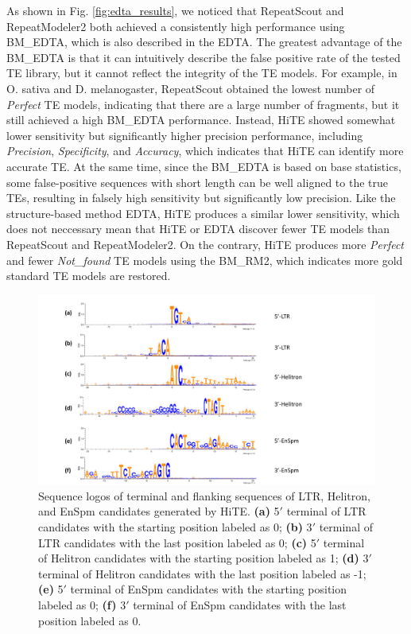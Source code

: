 \documentclass{bmcart}
\begin{document}
As shown in Fig. \ref{fig:edta_results}, we noticed that RepeatScout and RepeatModeler2 both achieved a consistently high performance using BM\_EDTA, which is also described in the EDTA\cite{ou2019benchmarking}. The greatest advantage of the BM\_EDTA is that it can intuitively describe the false positive rate of the tested TE library, but it cannot reflect the integrity of the TE models. For example, in O. sativa and D. melanogaster, RepeatScout obtained the lowest number of \emph{Perfect} TE models, indicating that there are a large number of fragments, but it still achieved a high BM\_EDTA performance. Instead, HiTE showed somewhat lower sensitivity but significantly higher precision performance, including \emph{Precision}, \emph{Specificity}, and \emph{Accuracy}, which indicates that HiTE can identify more accurate TE.  At the same time, since the BM\_EDTA is based on base statistics, some false-positive sequences with short length can be well aligned to the true TEs, resulting in falsely high sensitivity but significantly low precision. Like the structure-based method EDTA, HiTE produces a similar lower sensitivity, which does not neccessary mean that HiTE or EDTA discover fewer TE models than RepeatScout and RepeatModeler2. On the contrary, HiTE produces more \emph{Perfect} and fewer \emph{Not\_found} TE models using the BM\_RM2, which indicates more gold standard TE models are restored.

\begin{figure}[h!]
	\centerline{\includegraphics[width=1.0\textwidth]{figures/SeqLogos.pdf}}
	\caption{Sequence logos of terminal and flanking sequences of LTR, Helitron, and EnSpm candidates generated by HiTE. \textbf{(a)} 5$'$ terminal of LTR candidates with the starting position labeled as 0; \textbf{(b)} 3$'$ terminal of LTR candidates with the last position labeled as 0; \textbf{(c)} 5$'$ terminal of Helitron candidates with the starting position labeled as 1; \textbf{(d)} 3$'$ terminal of Helitron candidates with the last position labeled as -1; \textbf{(e)} 5$'$ terminal of EnSpm candidates with the starting position labeled as 0; \textbf{(f)} 3$'$ terminal of EnSpm candidates with the last position labeled as 0.}
	\label{fig:seq_logos}
\end{figure}
\end{document}
